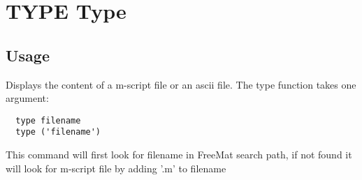 \section{TYPE Type}

\subsection{Usage}

Displays the content of a m-script file or an ascii file. 
The type function takes one argument:
\begin{verbatim}
  type filename
  type ('filename')
\end{verbatim}
This command will first look for filename in FreeMat search path,
if not found it will look for m-script file by adding '.m' to filename

